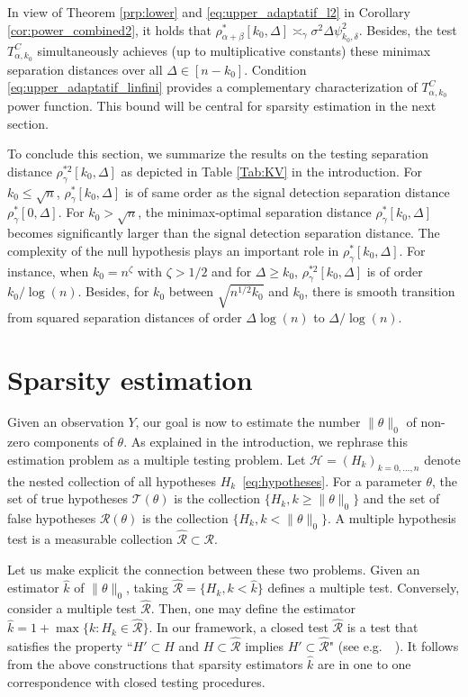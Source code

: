 \documentclass[twoside,11pt]{article}
\newcommand{\<}{\langle}
\renewcommand{\>}{\rangle}
\begin{document}
In view of Theorem \ref{prp:lower} and \eqref{eq:upper_adaptatif_l2} in  Corollary \ref{cor:power_combined2}, it holds that $\rho^{*}_{\alpha+\beta}[k_0,\Delta] \asymp_{\gamma} \sigma^2 \Delta \psi^2_{k_0,\delta}$. Besides, the test $T^{C}_{\alpha,k_0}$ simultaneously achieves (up to multiplicative constants) these minimax separation distances over all $\Delta\in [n-k_0]$. Condition \eqref{eq:upper_adaptatif_linfini} provides a complementary characterization of $T^{C}_{\alpha,k_0}$ power function. This bound will be central for sparsity estimation in the next section.


To conclude this section, we summarize the results on the  testing separation distance $\rho_{\gamma}^{*2}[k_0,\Delta]$ as depicted in Table \ref{Tab:KV} in the introduction. 
 For $k_0\leq \sqrt{n}$, $\rho_{\gamma}^{*}[k_0,\Delta]$ is of same order as the signal detection separation distance $\rho_{\gamma}^{*}[0,\Delta]$. 
 For $k_0 > \sqrt{n}$, the minimax-optimal separation distance $\rho_{\gamma}^{*}[k_0,\Delta]$ becomes significantly larger than the signal detection separation distance. The complexity of the null hypothesis
plays an important role in $\rho_{\gamma}^{*}[k_0,\Delta]$. For instance, when $k_0=n^{\zeta}$ with $\zeta>1/2$ and for $\Delta\geq k_0$, $\rho_{\gamma}^{*2}[k_0,\Delta]$ is of order $k_0/\log(n)$. Besides, for $k_0$ between $\sqrt{n^{1/2}k_0}$ and $k_0$, there is smooth transition from squared separation distances of order $\Delta\log(n)$ to $\Delta/\log(n)$.



\section{Sparsity estimation}\label{sec:estimation}

Given an observation $Y$, our goal is now to estimate the number $\|\theta\|_0$ of non-zero components of $\theta$. As explained in the introduction, we rephrase this estimation problem as a multiple testing problem. Let $\mathcal{H}= (H_{k})_{k=0,\ldots, n}$ denote the nested collection of all hypotheses $H_{k}$~\eqref{eq:hypotheses}. For a parameter $\theta$, the set of true hypotheses $\mathcal{T}(\theta)$ is the collection $\{H_k, k\geq \|\theta\|_0\}$ and the set of false hypotheses $\mathcal{R}(\theta)$ is the collection $\{H_k, k< \|\theta\|_0\}$. A multiple hypothesis test is a measurable collection $\widehat{\mathcal{R}}\subset \mathcal{R}$. 


Let us make explicit the connection between these two problems. Given an estimator $\widehat{k}$ of $\|\theta\|_0$, taking $\widehat{\mathcal{R}}= \{H_k, k <\widehat{k}\}$ defines a multiple test. Conversely, consider a multiple test $\widehat{\mathcal{R}}$. Then, one may define the estimator $\widehat{k}=1+ \max \{k: H_k \in \widehat{\mathcal{R}}\}$. In our framework, a closed test $\widehat{\mathcal{R}}$ is a test that satisfies the property ``$H'\subset H$ and $H\subset \widehat{\mathcal{R}}$ implies $H'\subset \widehat{\mathcal{R}}$" (see e.g.\ ~\cite{2016_fromont}). It follows from the above constructions that sparsity estimators $\widehat{k}$ are in one to one correspondence with closed testing procedures. 
\end{document}
